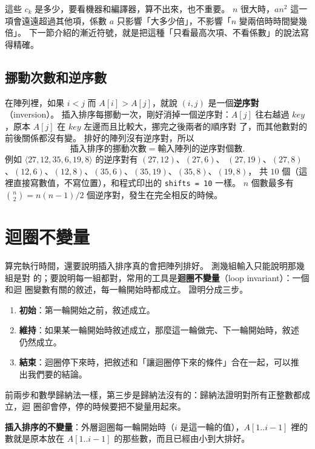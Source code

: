 這些 $c_k$ 是多少，要看機器和編譯器，算不出來，也不重要。 $n$ 很大時，$an^2$ 這一
項會遠遠超過其他項，係數 $a$ 只影響「大多少倍」，不影響「$n$ 變兩倍時時間變幾
倍」。 下一節介紹的漸近符號，就是把這種「只看最高次項、不看係數」的說法寫得精確。

\subsection{挪動次數和逆序數}

在陣列裡，如果 $i < j$ 而 $A[i] > A[j]$，就說 $(i, j)$ 是一個\textbf{逆序對}
（inversion）。 插入排序每挪動一次，剛好消掉一個逆序對：$A[j]$ 往右越過
$\mathit{key}$，原本 $A[j]$ 在 $\mathit{key}$ 左邊而且比較大，挪完之後兩者的順序對
了，而其他數對的前後關係都沒有變。 排好的陣列沒有逆序對，所以
\[
\text{插入排序的挪動次數} = \text{輸入陣列的逆序對個數}.
\]
例如 $\langle 27, 12, 35, 6, 19, 8 \rangle$ 的逆序對有 $(27,12)$、$(27,6)$、
$(27,19)$、$(27,8)$、$(12,6)$、$(12,8)$、$(35,6)$、$(35,19)$、$(35,8)$、$(19,8)$，
共 $10$ 個（這裡直接寫數值，不寫位置），和程式印出的 \texttt{shifts = 10} 一樣。
$n$ 個數最多有 $\binom{n}{2} = n(n-1)/2$ 個逆序對，發生在完全相反的時候。

\section{迴圈不變量}
\label{sec:ana-invariant}

算完執行時間，還要說明插入排序真的會把陣列排好。 測幾組輸入只能說明那幾組是對
的；要說明每一組都對，常用的工具是\textbf{迴圈不變量}（loop invariant）：一個和迴
圈變數有關的敘述，每一輪開始時都成立。 證明分成三步。

\begin{enumerate}
\item \textbf{初始}：第一輪開始之前，敘述成立。
\item \textbf{維持}：如果某一輪開始時敘述成立，那麼這一輪做完、下一輪開始時，敘述
仍然成立。
\item \textbf{結束}：迴圈停下來時，把敘述和「讓迴圈停下來的條件」合在一起，可以推
出我們要的結論。
\end{enumerate}

前兩步和數學歸納法一樣，第三步是歸納法沒有的：歸納法證明對所有正整數都成立，迴
圈卻會停，停的時候要把不變量用起來。

\textbf{插入排序的不變量}：外層迴圈每一輪開始時（$i$ 是這一輪的值），$A[1..i-1]$
裡的數就是原本放在 $A[1..i-1]$ 的那些數，而且已經由小到大排好。

